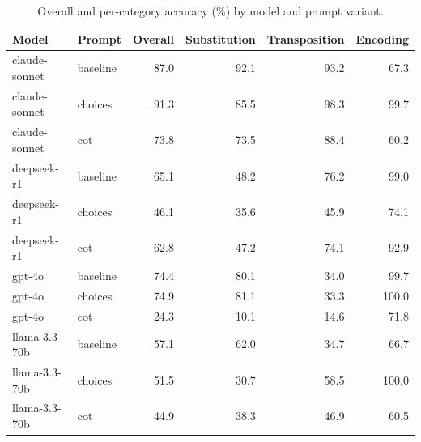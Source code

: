 \begin{table}
\caption{Overall and per-category accuracy (\%) by model and prompt variant.}
\label{tab:main_results}
\begin{tabular}{llrrrr}
\toprule
Model & Prompt & Overall & Substitution & Transposition & Encoding \\
\midrule
claude-sonnet & baseline & 87.0 & 92.1 & 93.2 & 67.3 \\
claude-sonnet & choices & 91.3 & 85.5 & 98.3 & 99.7 \\
claude-sonnet & cot & 73.8 & 73.5 & 88.4 & 60.2 \\
deepseek-r1 & baseline & 65.1 & 48.2 & 76.2 & 99.0 \\
deepseek-r1 & choices & 46.1 & 35.6 & 45.9 & 74.1 \\
deepseek-r1 & cot & 62.8 & 47.2 & 74.1 & 92.9 \\
gpt-4o & baseline & 74.4 & 80.1 & 34.0 & 99.7 \\
gpt-4o & choices & 74.9 & 81.1 & 33.3 & 100.0 \\
gpt-4o & cot & 24.3 & 10.1 & 14.6 & 71.8 \\
llama-3.3-70b & baseline & 57.1 & 62.0 & 34.7 & 66.7 \\
llama-3.3-70b & choices & 51.5 & 30.7 & 58.5 & 100.0 \\
llama-3.3-70b & cot & 44.9 & 38.3 & 46.9 & 60.5 \\
\bottomrule
\end{tabular}
\end{table}
